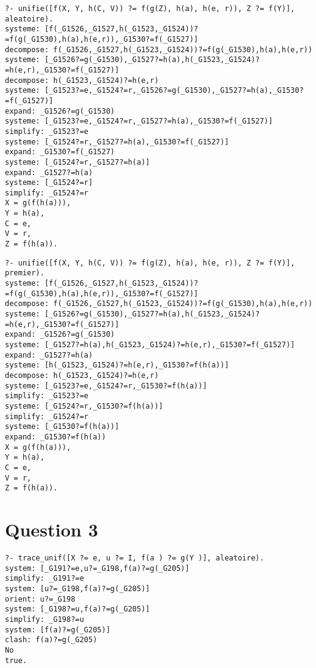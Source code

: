 \documentclass[10pt,a4paper]{report}
\begin{document}
\begin{lstlisting}[caption ={Exemple d'execution avec choix aléatoire}]
?- unifie([f(X, Y, h(C, V)) ?= f(g(Z), h(a), h(e, r)), Z ?= f(Y)], aleatoire).
systeme: [f(_G1526,_G1527,h(_G1523,_G1524))?=f(g(_G1530),h(a),h(e,r)),_G1530?=f(_G1527)]
decompose: f(_G1526,_G1527,h(_G1523,_G1524))?=f(g(_G1530),h(a),h(e,r))
systeme: [_G1526?=g(_G1530),_G1527?=h(a),h(_G1523,_G1524)?=h(e,r),_G1530?=f(_G1527)]
decompose: h(_G1523,_G1524)?=h(e,r)
systeme: [_G1523?=e,_G1524?=r,_G1526?=g(_G1530),_G1527?=h(a),_G1530?=f(_G1527)]
expand: _G1526?=g(_G1530)
systeme: [_G1523?=e,_G1524?=r,_G1527?=h(a),_G1530?=f(_G1527)]
simplify: _G1523?=e
systeme: [_G1524?=r,_G1527?=h(a),_G1530?=f(_G1527)]
expand: _G1530?=f(_G1527)
systeme: [_G1524?=r,_G1527?=h(a)]
expand: _G1527?=h(a)
systeme: [_G1524?=r]
simplify: _G1524?=r
X = g(f(h(a))),
Y = h(a),
C = e,
V = r,
Z = f(h(a)).
\end{lstlisting}

\begin{lstlisting}[caption ={Exemple d'execution avec comme choix le premier}]
?- unifie([f(X, Y, h(C, V)) ?= f(g(Z), h(a), h(e, r)), Z ?= f(Y)], premier).
systeme: [f(_G1526,_G1527,h(_G1523,_G1524))?=f(g(_G1530),h(a),h(e,r)),_G1530?=f(_G1527)]
decompose: f(_G1526,_G1527,h(_G1523,_G1524))?=f(g(_G1530),h(a),h(e,r))
systeme: [_G1526?=g(_G1530),_G1527?=h(a),h(_G1523,_G1524)?=h(e,r),_G1530?=f(_G1527)]
expand: _G1526?=g(_G1530)
systeme: [_G1527?=h(a),h(_G1523,_G1524)?=h(e,r),_G1530?=f(_G1527)]
expand: _G1527?=h(a)
systeme: [h(_G1523,_G1524)?=h(e,r),_G1530?=f(h(a))]
decompose: h(_G1523,_G1524)?=h(e,r)
systeme: [_G1523?=e,_G1524?=r,_G1530?=f(h(a))]
simplify: _G1523?=e
systeme: [_G1524?=r,_G1530?=f(h(a))]
simplify: _G1524?=r
systeme: [_G1530?=f(h(a))]
expand: _G1530?=f(h(a))
X = g(f(h(a))),
Y = h(a),
C = e,
V = r,
Z = f(h(a)).
\end{lstlisting}

\chapter*{Question 3}

\begin{lstlisting}[caption ={Exemple d'execution avec choix aléatoire}]
?- trace_unif([X ?= e, u ?= I, f(a ) ?= g(Y )], aleatoire).
system: [_G191?=e,u?=_G198,f(a)?=g(_G205)]
simplify: _G191?=e
system: [u?=_G198,f(a)?=g(_G205)]
orient: u?=_G198
system: [_G198?=u,f(a)?=g(_G205)]
simplify: _G198?=u
system: [f(a)?=g(_G205)]
clash: f(a)?=g(_G205)
No
true.
\end{lstlisting}
\end{document}
